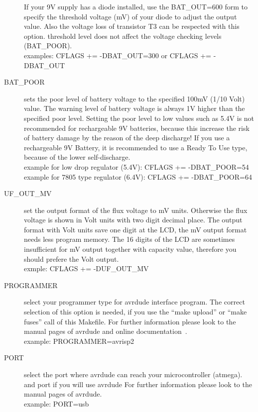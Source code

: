 \begin{description}
 If your 9V supply has a diode installed, use the BAT\_OUT=600 form to specify the threshold voltage (mV) of your diode
to adjust the output value.
Also the voltage loss of transistor T3 can be respected with this option.
 threshold level does not affect the voltage checking levels (BAT\_POOR).\\
examples: CFLAGS += -DBAT\_OUT=300  or CFLAGS += -DBAT\_OUT
  \item[BAT\_POOR] sets the poor level of battery voltage to the specified 100mV (1/10 Volt) value.
The warning level of battery voltage is always 1V higher than the specified poor level.
Setting the poor level to low values such as 5.4V is not recommended for rechargeable 9V batteries,
because this increase the risk of battery damage by the reason of the deep discharge!
If you use a rechargeable 9V Battery, it is recommended to use a Ready To Use type, because of the lower self-discharge.\\
example for low drop regulator (5.4V): CFLAGS += -DBAT\_POOR=54
example for 7805 type regulator (6.4V): CFLAGS += -DBAT\_POOR=64
  \item[UF\_OUT\_MV] set the output format of the flux voltage to mV units.
Otherwise the flux voltage is shown in Volt units with two digit decimal place.
The output format with Volt units save one digit at the LCD, the mV output format needs less program memory.
The 16 digits of the LCD are sometimes insufficient for mV output together with capacity value, therefore you should prefere the Volt output.\\
exmple: CFLAGS += -DUF\_OUT\_MV
  \item[PROGRAMMER] select your programmer type for avrdude interface program.
The correct selection of this option is needed, if you use the ``make upload'' or ``make fuses'' call
of this Makefile.
For further information please look to the manual pages of avrdude and online documentation~\cite{avrdude}.\\
example: PROGRAMMER=avrisp2
  \item[PORT] select the port where avrdude can reach your microcontroller (atmega).
and port if you will use avrdude
For further information please look to the manual pages of avrdude.\\
example: PORT=usb

\end{description}

